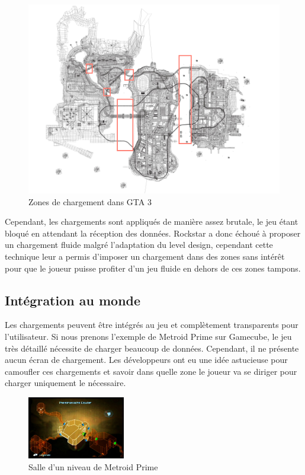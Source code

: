 \documentclass[a4paper, 12pt]{article} %
\begin{document}
\begin{figure}[!h]%
\includegraphics[width=\columnwidth]{images/gta3_map.png}%
\caption{Zones de chargement dans GTA 3}%
\label{}%
\end{figure}

Cependant, les chargements sont appliqués de manière assez brutale, le jeu étant bloqué en attendant la réception des données. Rockstar a donc échoué à proposer un chargement fluide malgré l'adaptation du level design, cependant cette technique leur a permis d'imposer un chargement dans des zones sans intérêt pour que le joueur puisse profiter d'un jeu fluide en dehors de ces zones tampons.

\newpage
\subsection{Intégration au monde}
Les chargements peuvent être intégrés au jeu et complètement transparents pour l'utilisateur. Si nous prenons l'exemple de Metroid Prime sur Gamecube, le jeu très détaillé nécessite de charger beaucoup de données. Cependant, il ne présente aucun écran de chargement. Les développeurs ont eu une idée astucieuse pour camoufler ces chargements et savoir dans quelle zone le joueur va se diriger pour charger uniquement le nécessaire.

\begin{figure}
\begin{center}
\includegraphics[width=0.38\textwidth]{images/metroid-prime_map.png}
\end{center}
\caption{Salle d'un niveau de Metroid Prime}
\end{figure}
\end{document}
